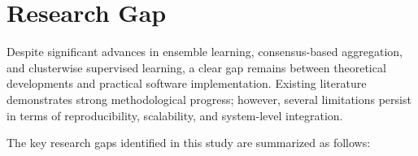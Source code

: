 
\section{Research Gap}

\hs Despite significant advances in ensemble learning, consensus-based aggregation, and clusterwise supervised learning, a clear gap remains between theoretical developments and practical software implementation. Existing literature demonstrates strong methodological progress; however, several limitations persist in terms of reproducibility, scalability, and system-level integration.

The key research gaps identified in this study are summarized as follows:

